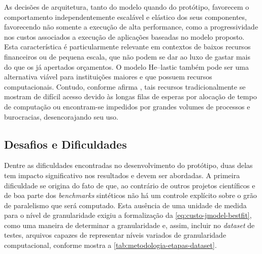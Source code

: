 \documentclass[english,brazilian]{UNISINOSmonografia} %
\begin{document}
As decisões de arquitetura, tanto do modelo quando do protótipo, favorecem o comportamento independentemente escalável e elástico dos seus componentes, favorecendo não somente a execução de alta performance, como a progressividade nos custos associados a execução de aplicações baseadas no modelo proposto.
%
Esta característica é particularmente relevante em contextos de baixos recursos financeiros ou de pequena escala, que não podem se dar ao luxo de gastar mais do que os já apertados orçamentos.
%
O modelo \textsf{He}--lastic também pode ser uma alternativa viável para instituições maiores e que possuem recursos computacionais.
%
Contudo, conforme afirma , tais recursos tradicionalmente se mostram de difícil acesso devido às longas filas de esperas por alocação de tempo de computação ou encontram-se impedidos por grandes volumes de processos e burocracias, desencorajando seu uso.






\subsection{Desafios e Dificuldades}
\label{sec:metodologia-prototipo-dificuldades}


Dentre as dificuldades encontradas no desenvolvimento do protótipo, duas delas tem impacto significativo nos resultados e devem ser abordadas.
%
A primeira dificuldade se origina do fato de que, ao contrário de outros projetos científicos e de boa parte dos \textit{benchmarks} sintéticos não há um controle explícito sobre o grão de paralelismo que será computado.
%
Esta ausência de uma unidade de medida para o nível de granularidade exigiu a formalização da \autoref{eq:custo-jmodel-bestfit}, como uma maneira de determinar a granularidade e, assim, incluir no \textit{dataset} de testes, arquivos capazes de representar níveis variados de granularidade computacional, conforme mostra a \autoref{tab:metodologia-etapas-dataset}.
\end{document}
